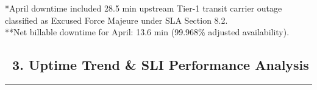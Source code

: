 \documentclass[11pt,a4paper]{scrartcl}
\begin{document}
\vspace{1pt}
\noindent\begin{minipage}{\textwidth}
    \tiny \textcolor{textmuted}{*April downtime included 28.5 min upstream Tier-1 transit carrier outage classified as Excused Force Majeure under SLA Section 8.2.} \\
    \tiny \textcolor{textmuted}{**Net billable downtime for April: 13.6 min (99.968\% adjusted availability).}
\end{minipage}

\clearpage


\subsection*{\textcolor{navyblue}{\faChartBar\ 3. Uptime Trend \& SLI Performance Analysis}}
\hrule
\vspace{6pt}
\end{document}
